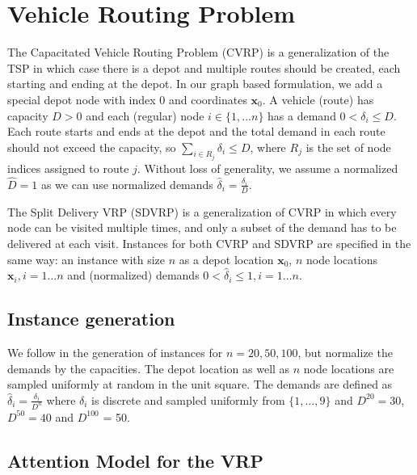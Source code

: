\section{Vehicle Routing Problem}
\label{sec:appendix_vrp}
The Capacitated Vehicle Routing Problem (CVRP) is a generalization of the TSP in which case there is a depot and multiple routes should be created, each starting and ending at the depot. In our graph based formulation, we add a special depot node with index 0 and coordinates $\mathbf{x}_0$. A vehicle (route) has capacity $D > 0$ and each (regular) node $i \in \{1, \ldots n\}$ has a demand $0 < \delta_i \le D$.  Each route starts and ends at the depot and the total demand in each route should not exceed the capacity, so $\sum_{i\in R_j} \delta_i \le D$, where $R_j$ is the set of node indices assigned to route $j$. Without loss of generality, we assume a normalized $\hat{D} = 1$ as we can use normalized demands $\hat{\delta}_i = \frac{\delta_i}{D}$.

The Split Delivery VRP (SDVRP) is a generalization of CVRP in which every node can be visited multiple times, and only a subset of the demand has to be delivered at each visit. Instances for both CVRP and SDVRP are specified in the same way: an instance with size $n$ as a depot location $\mathbf{x}_0$, $n$ node locations $\mathbf{x}_i, i = 1 \ldots n$ and (normalized) demands $0 < \hat{\delta}_i \le 1, i = 1 \ldots n$.

\subsection{Instance generation}
We follow \citet{nazari2018reinforcement} in the generation of instances for $n = 20, 50, 100$, but normalize the demands by the capacities. The depot location as well as $n$ node locations are sampled uniformly at random in the unit square. The demands are defined as $\hat{\delta}_i = \frac{\delta_i}{D^n}$ where $\delta_i$ is discrete and sampled uniformly from $\{1, \ldots, 9\}$ and $D^{20} = 30$, $D^{50} = 40$ and $D^{100}$ = 50.

\subsection{Attention Model for the VRP}

